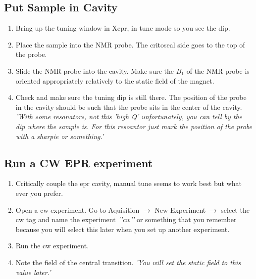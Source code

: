 \documentclass{article}
\newcommand{\fc}[1]{{\color{blue}\textit{'{#1}'}}}
\begin{document}
\subsection{Put Sample in Cavity}
\begin{enumerate}
    \item Bring up the tuning window in Xepr, in tune mode so you see the dip.
    \item Place the sample into the NMR probe. The critoseal side goes to the top of the probe.
    \item Slide the NMR probe into the cavity. Make sure the $B_1$ of the NMR probe is oriented appropriately relatively to the static field of the magnet.
    \item Check and make sure the tuning dip is still there. The position of the probe in the cavity should be such that the probe sits in the center of the cavity. \fc{With some resonators, not this 'high Q' unfortunately, you can tell by the dip where the sample is. For this resoantor just mark the position of the probe with a sharpie or something.}
\end{enumerate}
\subsection{Run a CW EPR experiment}
\begin{enumerate}
    \item Critically couple the epr cavity, manual tune seems to work best but what ever you prefer.
    \item Open a cw experiment. Go to Aquisition $\rightarrow$ New Experiment $\rightarrow$ select the cw tag and name the experiment \fc{'cw'} or something that you remember because you will select this later when you set up another experiment.
    \item Run the cw experiment.
    \item Note the field of the central transition. \fc{You will set the static field to this value later.}
\end{enumerate}
\end{document}

